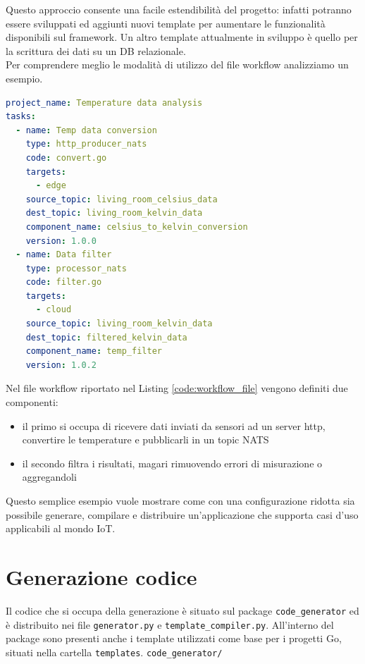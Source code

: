 Questo approccio consente una facile estendibilità del progetto: infatti potranno essere sviluppati ed aggiunti nuovi template per aumentare le funzionalità disponibili sul framework. Un altro template attualmente in sviluppo è quello per la scrittura dei dati su un DB relazionale.\\
Per comprendere meglio le modalità di utilizzo del file workflow analizziamo un esempio.

\begin{lstlisting}[language=yaml, caption={Esempio Workflow file con processor e producer}, captionpos=b, label={code:workflow_file}, keepspaces=true]
project_name: Temperature data analysis
tasks:
  - name: Temp data conversion
    type: http_producer_nats
    code: convert.go
    targets:
      - edge
    source_topic: living_room_celsius_data
    dest_topic: living_room_kelvin_data
    component_name: celsius_to_kelvin_conversion
    version: 1.0.0
  - name: Data filter
    type: processor_nats
    code: filter.go
    targets:
      - cloud
    source_topic: living_room_kelvin_data
    dest_topic: filtered_kelvin_data
    component_name: temp_filter
    version: 1.0.2
\end{lstlisting}

Nel file workflow riportato nel Listing \ref{code:workflow_file} vengono definiti due componenti:
\begin{itemize}
    \item il primo si occupa di ricevere dati inviati da sensori ad un server http, convertire le temperature e pubblicarli in un topic NATS
    \item il secondo filtra i risultati, magari rimuovendo errori di misurazione o aggregandoli
\end{itemize}
Questo semplice esempio vuole mostrare come con una configurazione ridotta sia possibile generare, compilare e distribuire un'applicazione che supporta casi d'uso applicabili al mondo IoT.

\section{Generazione codice}

Il codice che si occupa della generazione è situato sul package \texttt{code\_generator} ed è distribuito nei file \texttt{generator.py} e \texttt{template\_compiler.py}. All'interno del package sono presenti anche i template utilizzati come base per i progetti Go, situati nella cartella \texttt{templates}.
\texttt{code\_generator/}

